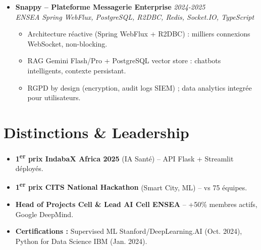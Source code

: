 \documentclass[a4paper,11pt]{article}
\begin{document}
\begin{itemize}[leftmargin=*, label=\tiny$\bullet$, nosep]
    \item \textbf{Snappy -- Plateforme Messagerie Enterprise} \hfill \textit{2024-2025} \\
    \textit{ENSEA} \hfill \textit{Spring WebFlux, PostgreSQL, R2DBC, Redis, Socket.IO, TypeScript}
    \vspace{-2pt}
    \begin{itemize}[leftmargin=0.4cm, nosep, label=\tiny$\bullet$]
        \item \small{Architecture r\'eactive (Spring WebFlux + R2DBC) : milliers connexions WebSocket, non-blocking.}
        \item \small{RAG Gemini Flash/Pro + PostgreSQL vector store : chatbots intelligents, contexte persistant.}
        \item \small{RGPD by design (encryption, audit logs SIEM) ; data analytics integr\'ee pour utilisateurs.}
    \end{itemize}
\end{itemize}

\section{Distinctions \& Leadership}
\begin{itemize}[leftmargin=*, label=\tiny$\bullet$, nosep]
    \item \small{\textbf{1\textsuperscript{er} prix IndabaX Africa 2025} (IA Sant\'e) -- API Flask + Streamlit d\'eploy\'es.}
    \item \small{\textbf{1\textsuperscript{er} prix CITS National Hackathon} (Smart City, ML) -- vs 75 \'equipes.}
    \item \small{\textbf{Head of Projects Cell \& Lead AI Cell ENSEA} -- +50\% membres actifs, Google DeepMind.}
    \item \small{\textbf{Certifications :} Supervised ML Stanford/DeepLearning.AI (Oct. 2024), Python for Data Science IBM (Jan. 2024).}
\end{itemize}
\end{document}
